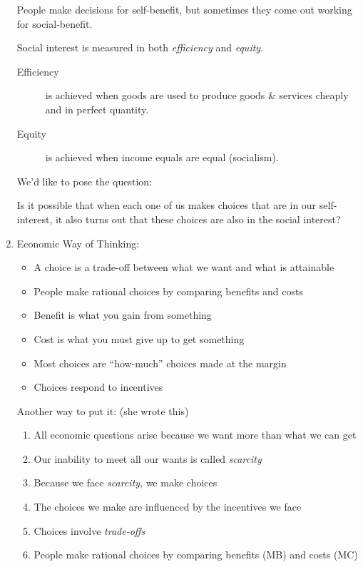 \begin{enumerate}
                    People make decisions for self-benefit, but sometimes they come out working for social-benefit.

                    Social interest is measured in both \emph{efficiency} and \emph{equity}.
                    \begin{description}
                        \item[Efficiency] is achieved when goods are used to produce goods \& services cheaply and in perfect quantity.
                        \item[Equity] is achieved when income equals are equal (socialism).
                    \end{description}

                    We'd like to pose the question:

                    Is it possible that when each one of us makes choices that are in our self-interest, it also turns out that these choices are also in the social interest?

                \item Economic Way of Thinking:

                    \begin{itemize}
                        \item A choice is a trade-off between what we want and what is attainable
                        \item People make rational choices by comparing benefits and costs
                        \item Benefit is what you gain from something
                        \item Cost is what you must give up to get something
                        \item Most choices are ``how-much'' choices made at the margin
                        \item Choices respond to incentives
                    \end{itemize}

                    Another way to put it: (she wrote this)

                    \begin{enumerate}
                        \item All economic questions arise because we want more than what we can get
                        \item Our inability to meet all our wants is called \emph{scarcity}
                        \item Because we face \emph{scarcity}, we make choices
                        \item The choices we make are influenced by the incentives we face
                        \item Choices involve \emph{trade-offs}
                        \item People make rational choices by comparing benefits (MB) and costs (MC)
                    \end{enumerate}


\end{enumerate}
